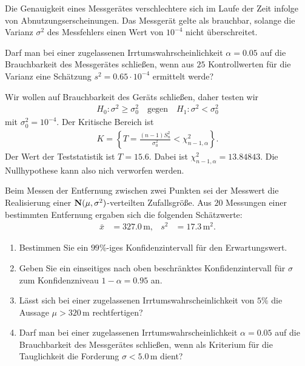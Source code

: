  Die Genauigkeit eines Messgerätes verschlechtere
sich im Laufe der Zeit infolge von Abnutzungserscheinungen. Das Messgerät gelte
als brauchbar, solange die Varianz $\sigma^2$ des Messfehlers einen Wert von
$10^{-4}$ nicht überschreitet.

Darf man bei einer zugelassenen Irrtumswahrscheinlichkeit $\alpha=0.05$ auf die
Brauchbarkeit des Messgerätes schließen, wenn aus $25$ Kontrollwerten für die
Varianz eine Schätzung $s^2 = 0.65 \cdot{} 10^{-4}$ ermittelt werde? 

\solution Wir wollen auf Brauchbarkeit des Geräts schließen, daher 
testen wir
\begin{align*}
    H_0 : \sigma^2 \geq \sigma^2_0 \quad\text{gegen}\quad H_1 : \sigma^2 < \sigma^2_0 
\end{align*}
mit $\sigma^2_0=10^{-4}$. Der Kritische Bereich ist 
\begin{align*}
    K = \left\{ T = \frac{(n-1) S^2_n}{\sigma^2_0} < \chi^2_{n-1, \alpha}   \right\}.
\end{align*}
Der Wert der Teststatistik ist $T = 15.6$. Dabei ist $\chi^2_{n-1, \alpha} =
13.84843$. Die Nullhypothese kann also nich verworfen werden. 

 Beim Messen der
Entfernung zwischen zwei Punkten sei der Messwert die Realisierung einer
$\mathbf N(\mu,\sigma^2)$-verteilten Zufallsgröße. Aus $20$ Messungen einer
bestimmten Entfernung ergaben sich die folgenden Schätzwerte:
\begin{align*}
    \bar x &= 327.0\,\text{m}, & s^2 &= 17.3\, \text{m}^2.
\end{align*}
\begin{enumerate}
    \item Bestimmen Sie ein $99\%$-iges Konfidenzintervall für den Erwartungswert.
    \item Geben Sie ein einseitiges nach oben beschränktes Konfidenzintervall für 
        $\sigma$ zum Konfidenzniveau $1-\alpha = 0.95$ an. 
    \item Lässt sich bei einer zugelassenen Irrtumswahrscheinlichkeit von $5\%$ die Aussage
        $\mu>320\,\text{m}$ rechtfertigen?
    \item Darf man bei einer zugelassenen Irrtumswahrscheinlichkeit $\alpha=0.05$ auf die
        Brauchbarkeit des Messgerätes schließen, wenn als Kriterium für die Tauglichkeit
        die Forderung $\sigma<5.0\,\text{m}$ dient?
\end{enumerate}

